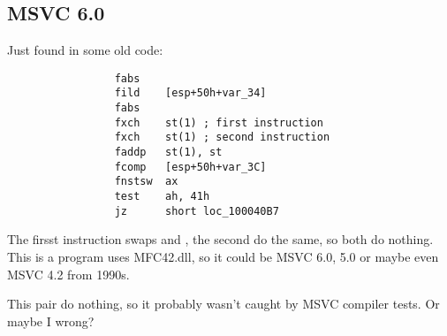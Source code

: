 \subsection{MSVC 6.0}

Just found in some old code:

\begin{lstlisting}
                 fabs
                 fild    [esp+50h+var_34]
                 fabs
                 fxch    st(1) ; first instruction
                 fxch    st(1) ; second instruction
                 faddp   st(1), st
                 fcomp   [esp+50h+var_3C]
                 fnstsw  ax
                 test    ah, 41h
                 jz      short loc_100040B7
\end{lstlisting}

The firsst  instruction swaps  and , the second do the same, so both do nothing.
This is a program uses MFC42.dll, so it could be MSVC 6.0, 5.0 or maybe even MSVC 4.2 from 1990s.

This pair do nothing, so it probably wasn't caught by MSVC compiler tests.
Or maybe I wrong?

